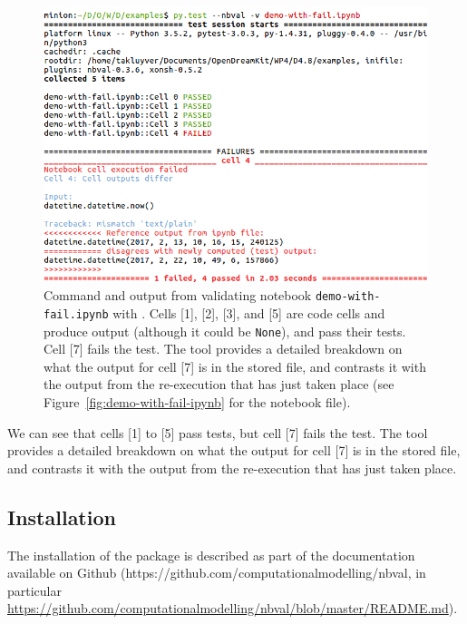 \documentclass{deliverablereport}
\begin{document}
\begin{figure}[ht]
  \centering
  \includegraphics[width=1\textwidth]{examples/demo-with-fail-pytest.png}
  \caption{\nbval Command and output from validating notebook
    \texttt{demo-with-fail.ipynb} with \nbval. Cells [1], [2], [3],
    and [5] are code cells and produce output (although it could be
    \texttt{None}), and pass their tests. Cell [7] fails the test. The
    tool provides a detailed breakdown on what the output for cell [7]
    is in the stored file, and contrasts it with the output from the
    re-execution that has just taken place (see
    Figure~\ref{fig:demo-with-fail-ipynb} for the notebook
    file).\label{fig:demo-with-fail-pytest}}
\end{figure}

We can see that cells [1] to [5] pass tests, but cell [7] fails the test. The
tool provides a detailed breakdown on what the output for cell [7]
is in the stored file, and contrasts it with the output from the
re-execution that has just taken place.


\clearpage
\subsection{Installation}\label{sec:installation}

The installation of the package is described as part of the
documentation available on Github
(https://github.com/computationalmodelling/nbval, in particular\linebreak
\href{https://github.com/computationalmodelling/nbval/blob/master/README.md}{https://github.com/computationalmodelling/nbval/blob/master/README.md}).
\end{document}
